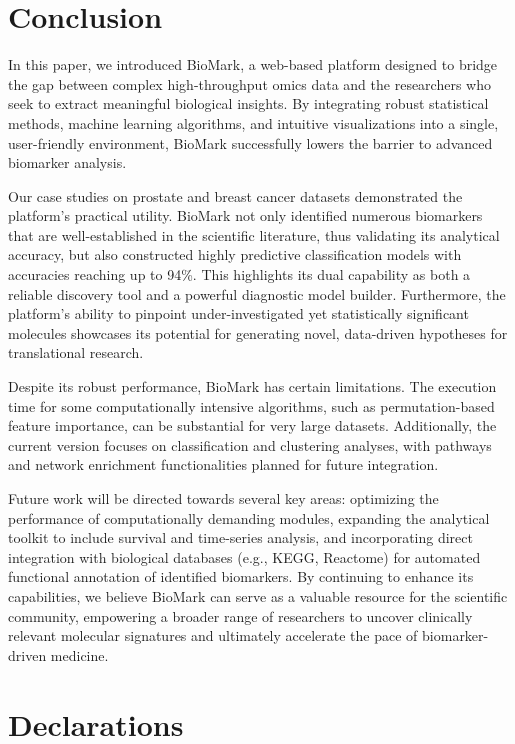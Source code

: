 \documentclass[journal]{IEEEtran}
\begin{document}
\section{Conclusion}
In this paper, we introduced BioMark, a web-based platform designed to bridge the gap between complex high-throughput omics data and the researchers who seek to extract meaningful biological insights. By integrating robust statistical methods, machine learning algorithms, and intuitive visualizations into a single, user-friendly environment, BioMark successfully lowers the barrier to advanced biomarker analysis.

Our case studies on prostate and breast cancer datasets demonstrated the platform's practical utility. BioMark not only identified numerous biomarkers that are well-established in the scientific literature, thus validating its analytical accuracy, but also constructed highly predictive classification models with accuracies reaching up to 94\%. This highlights its dual capability as both a reliable discovery tool and a powerful diagnostic model builder. Furthermore, the platform's ability to pinpoint under-investigated yet statistically significant molecules showcases its potential for generating novel, data-driven hypotheses for translational research.

Despite its robust performance, BioMark has certain limitations. The execution time for some computationally intensive algorithms, such as permutation-based feature importance, can be substantial for very large datasets. Additionally, the current version focuses on classification and clustering analyses, with pathways and network enrichment functionalities planned for future integration.

Future work will be directed towards several key areas: optimizing the performance of computationally demanding modules, expanding the analytical toolkit to include survival and time-series analysis, and incorporating direct integration with biological databases (e.g., KEGG, Reactome) for automated functional annotation of identified biomarkers. By continuing to enhance its capabilities, we believe BioMark can serve as a valuable resource for the scientific community, empowering a broader range of researchers to uncover clinically relevant molecular signatures and ultimately accelerate the pace of biomarker-driven medicine.

\section{Declarations}
\end{document}
